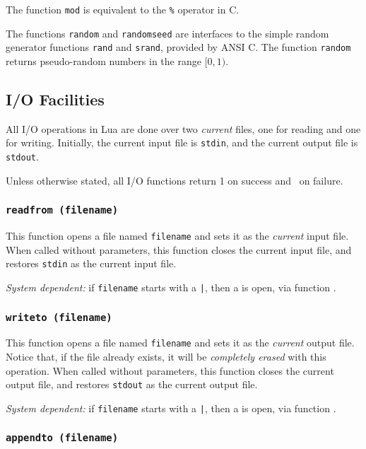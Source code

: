 The function \verb'mod' is equivalent to the \verb'%' operator in C.

The functions \verb'random' and \verb'randomseed' are interfaces to
the simple random generator functions \verb'rand' and \verb'srand',
provided by ANSI C.
The function \verb'random' returns pseudo-random numbers in the range
$[0,1)$.


\subsection{I/O Facilities} \label{libio}

All I/O operations in Lua are done over two {\em current} files,
one for reading and one for writing.
Initially, the current input file is \verb'stdin',
and the current output file is \verb'stdout'.

Unless otherwise stated,
all I/O functions return 1 on success and \nil\ on failure.

\subsubsection*{{\tt readfrom (filename)}}

This function opens a file named \verb'filename' and sets it as the
{\em current} input file.
When called without parameters,
this function closes the current input file,
and restores \verb'stdin' as the current input file.

{\em System dependent:} if \verb'filename' starts with a \verb'|',
then a  is open, via function .

\subsubsection*{{\tt writeto (filename)}}

This function opens a file named \verb'filename' and sets it as the
{\em current} output file.
Notice that, if the file already exists,
it will be {\em completely erased} with this operation.
When called without parameters,
this function closes the current output file,
and restores \verb'stdout' as the current output file.

{\em System dependent:} if \verb'filename' starts with a \verb'|',
then a  is open, via function .

\subsubsection*{{\tt appendto (filename)}}

